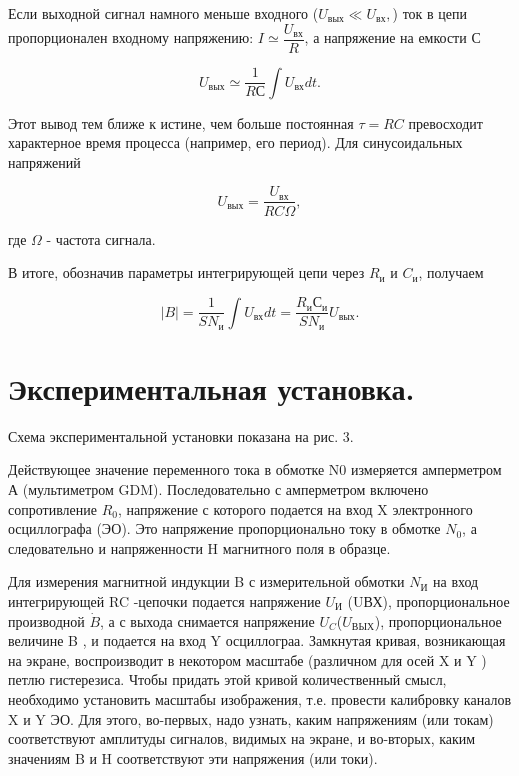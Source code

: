 \documentclass[a4paper]{article}
\begin{document}
Если выходной сигнал намного меньше входного ($U_{вых}\ll U_{вх},$) ток в цепи пропорционален входному напряжению: $I\simeq\dfrac{U_{вх}}{R}$, а напряжение на емкости С

$$U_{вых}\simeq\dfrac{1}{RС}\int U_{вх}dt.$$

Этот вывод тем ближе к истине, чем больше постоянная $\tau=RC$ превосходит характерное время процесса (например, его период). Для синусоидальных напряжений

$$U_{вых}=\dfrac{U_{вх}}{RC\Omega},$$

где $\Omega$ - частота сигнала.

В итоге, обозначив параметры интегрирующей цепи через $R_{и}$ и $C_{и}$, получаем

$$ |B|=\dfrac{1}{SN_{и}}\int U_{вх}dt=\dfrac{R_{и}С_{и}}{SN_{и}}U_{вых}.$$

\section{Экспериментальная установка.}
Схема экспериментальной установки показана на рис. 3.

Действующее значение переменного тока в обмотке N0 измеряется амперметром А (мультиметром GDM). Последовательно с амперметром включено сопротивление $R_{0}$, напряжение с которого подается на вход X электронного осциллографа (ЭО). Это напряжение пропорционально току в обмотке $N_{0}$, а следовательно и напряженности H магнитного поля в образце.

Для измерения магнитной индукции B с измерительной обмотки $N_{И}$ на вход интегрирующей RC -цепочки подается напряжение $U_{И}$ (UВХ), пропорциональное производной $\dot{B}$, а с выхода снимается напряжение $U_{C}$($U_{ВЫХ}$), пропорциональное
величине B , и подается на вход Y осциллограа.
Замкнутая кривая, возникающая на экране, воспроизводит в некотором масштабе (различном для осей X и Y ) петлю гистерезиса. Чтобы придать этой кривой количественный смысл, необходимо установить масштабы изображения, т.е. провести калибровку каналов X и Y ЭО. Для этого, во-первых, надо узнать, каким напряжениям (или токам) соответствуют амплитуды сигналов, видимых на экране, и во-вторых,  каким значениям B и H соответствуют эти напряжения
(или токи).
\end{document}
